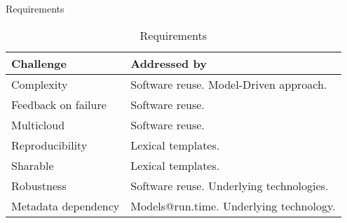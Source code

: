 \begin{table}
    \caption{Requirements}
    \begin{tabular}{ | l | p{} | }
      \hline
      \textbf{Challenge} & \textbf{Addressed by} \\ \hline

      Complexity & Software reuse.
        Model-Driven approach.  \\ \hline

      Feedback on failure & Software reuse. \\ \hline

      Multicloud & Software reuse.  \\ \hline

      Reproducibility & Lexical templates. \\ \hline

      Sharable & Lexical templates. \\ \hline

      Robustness & Software reuse. 
        Underlying technologies. \\ \hline

      Metadata dependency & Models@run.time. 
        Underlying technology. \\ \hline

    \end{tabular}
  \caption{Requirements}
  \label{table:requirements}
\end{table}

